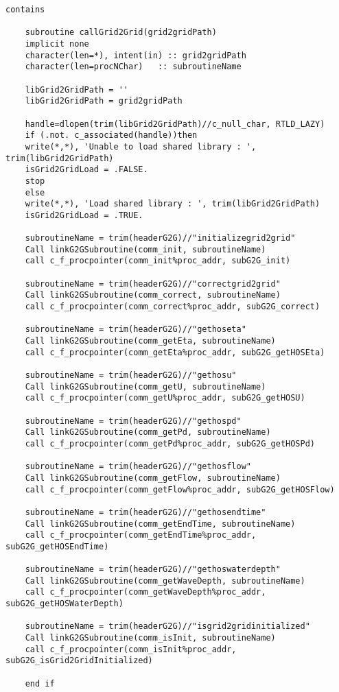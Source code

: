 \begin{lstlisting}[language={[95]Fortran}]
	contains
	
	subroutine callGrid2Grid(grid2gridPath)
	implicit none
	character(len=*), intent(in) :: grid2gridPath
	character(len=procNChar)   :: subroutineName
	
	libGrid2GridPath = ''
	libGrid2GridPath = grid2gridPath
	
	handle=dlopen(trim(libGrid2GridPath)//c_null_char, RTLD_LAZY)
	if (.not. c_associated(handle))then
	write(*,*), 'Unable to load shared library : ', trim(libGrid2GridPath)
	isGrid2GridLoad = .FALSE.
	stop
	else
	write(*,*), 'Load shared library : ', trim(libGrid2GridPath)
	isGrid2GridLoad = .TRUE.
	
	subroutineName = trim(headerG2G)//"initializegrid2grid"
	Call linkG2GSubroutine(comm_init, subroutineName)
	call c_f_procpointer(comm_init%proc_addr, subG2G_init)
	
	subroutineName = trim(headerG2G)//"correctgrid2grid"
	Call linkG2GSubroutine(comm_correct, subroutineName)
	call c_f_procpointer(comm_correct%proc_addr, subG2G_correct)
	
	subroutineName = trim(headerG2G)//"gethoseta"
	Call linkG2GSubroutine(comm_getEta, subroutineName)
	call c_f_procpointer(comm_getEta%proc_addr, subG2G_getHOSEta)
	
	subroutineName = trim(headerG2G)//"gethosu"
	Call linkG2GSubroutine(comm_getU, subroutineName)
	call c_f_procpointer(comm_getU%proc_addr, subG2G_getHOSU)
	
	subroutineName = trim(headerG2G)//"gethospd"
	Call linkG2GSubroutine(comm_getPd, subroutineName)
	call c_f_procpointer(comm_getPd%proc_addr, subG2G_getHOSPd)
	
	subroutineName = trim(headerG2G)//"gethosflow"
	Call linkG2GSubroutine(comm_getFlow, subroutineName)
	call c_f_procpointer(comm_getFlow%proc_addr, subG2G_getHOSFlow)
	
	subroutineName = trim(headerG2G)//"gethosendtime"
	Call linkG2GSubroutine(comm_getEndTime, subroutineName)
	call c_f_procpointer(comm_getEndTime%proc_addr, subG2G_getHOSEndTime)
	
	subroutineName = trim(headerG2G)//"gethoswaterdepth"
	Call linkG2GSubroutine(comm_getWaveDepth, subroutineName)
	call c_f_procpointer(comm_getWaveDepth%proc_addr, subG2G_getHOSWaterDepth)
	
	subroutineName = trim(headerG2G)//"isgrid2gridinitialized"
	Call linkG2GSubroutine(comm_isInit, subroutineName)
	call c_f_procpointer(comm_isInit%proc_addr, subG2G_isGrid2GridInitialized)
	
	end if
	

\end{lstlisting}
